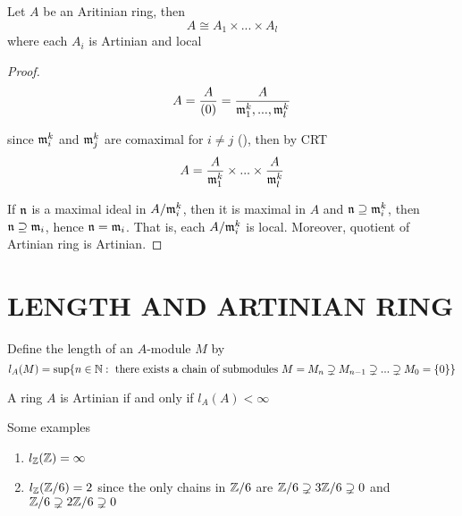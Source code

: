 \begin{corollary}
	Let $A$ be an Aritinian ring, then 
	$$
		A \cong A_1 \times ... \times A_l
	$$
	where each $A_i$ is Artinian and local
\end{corollary}

\begin{proof}
	$$
		A = \frac{A}{(0)} = \frac{A}{\mathfrak{m}_1^k, ..., \mathfrak{m}_l^k}
	$$
	
	since $\mathfrak{m}_i^k$ and $\mathfrak{m}_j^k$ are comaximal for $i \neq j$ (), then by CRT
	$$
		A = \frac{A}{\mathfrak{m}_1^k} \times ... \times \frac{A}{\mathfrak{m}_l^k}
	$$
	
	If $\mathfrak{n}$ is a maximal ideal in $A / \mathfrak{m}_i^k$, then it is maximal in $A$ and $\mathfrak{n} \supseteq \mathfrak{m}_i^k$, then $\mathfrak{n} \supseteq \mathfrak{m}_i$, hence $\mathfrak{n} = \mathfrak{m}_i$. That is, each $A / \mathfrak{m}_i^k$ is local. Moreover, quotient of Artinian ring is Artinian.
\end{proof}

\section{LENGTH AND ARTINIAN RING}

\begin{definition}[length]
	Define the length of an $A$-module $M$ by
	$$
		l_A(M) = \sup \{n \in \mathbb{N}: \text{ there exists a chain of submodules } M = M_n \supsetneq M_{n-1} \supsetneq ... \supsetneq M_0 = \{0\}\}
	$$
\end{definition}

\begin{remark}
	A ring $A$ is Artinian if and only if $l_A(A) < \infty$
\end{remark}

\begin{remark}
	Some examples
	\begin{enumerate}
		\item $l_{\mathbb{Z}}(\mathbb{Z}) = \infty$
		\item $l_{\mathbb{Z}}(\mathbb{Z} / 6) = 2$ since the only chains in $\mathbb{Z} / 6$ are $\mathbb{Z} / 6 \supsetneq 3 \mathbb{Z} / 6 \supsetneq 0$ and $\mathbb{Z} / 6 \supsetneq 2 \mathbb{Z} / 6 \supsetneq 0$
	\end{enumerate}
\end{remark}

